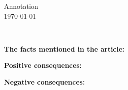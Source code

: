 \documentclass[12pt]{article}
\begin{document}
	\begin{center}
		{\LARGE Annotation}\\
		\today
	\end{center}
	\par
	\large
	
	\\
	\vspace{0.3in}
	{
	\newline
	\textbf{The facts mentioned in the article:}
	{\normalsize
	\par
	
	}
	\hrulefill
	\vspace{0.15in}
	\newline
	\textbf{Positive consequences:}
	{\normalsize
	\par
	
	\hrulefill
	}	
	\vspace{0.15in}
	\newline
	\textbf{ Negative consequences:}
	{\normalsize
	\par
	
	}
	}
\end{document}
